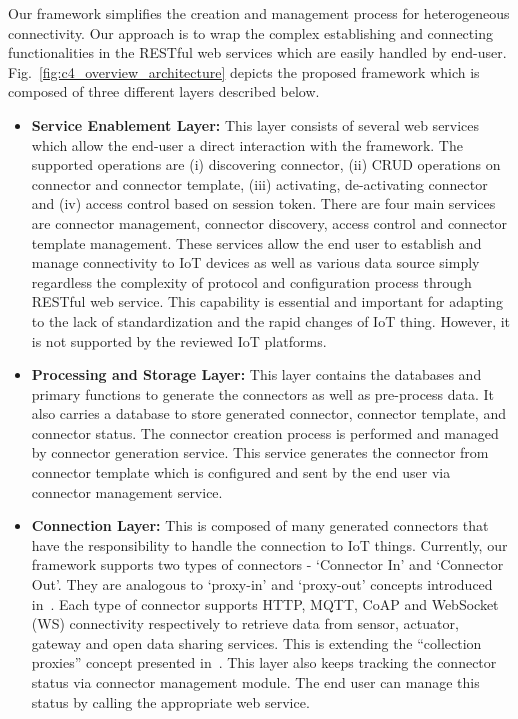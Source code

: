 Our framework simplifies the creation and management process for heterogeneous connectivity. Our approach is to wrap the complex establishing and connecting functionalities in the RESTful web services which are easily handled by end-user. Fig.~\ref{fig:c4_overview_architecture} depicts the proposed framework which is composed of three different layers described below.
\begin{itemize}
    \item \textbf{Service Enablement Layer:} This layer consists of several web services which allow the end-user a direct interaction with the framework. The supported operations are (i) discovering connector, (ii) CRUD operations on connector and connector template, (iii) activating, de-activating connector and (iv) access control based on session token. There are four main services are connector management, connector discovery, access control and connector template management. These services allow the end user to establish and manage connectivity to IoT devices as well as various data source simply regardless the complexity of protocol and configuration process through RESTful web service. This capability is essential and important for adapting to the lack of standardization and the rapid changes of IoT thing. However, it is not supported by the reviewed IoT platforms.
    \item \textbf{Processing and Storage Layer:} This layer contains the databases and primary functions to generate the connectors as well as pre-process data. It also carries a database to store generated connector, connector template, and connector status. The connector creation process is performed and managed by connector generation service. This service generates the connector from connector template which is configured and sent by the end user via connector management service.
    \item \textbf{Connection Layer: } This is composed of many generated connectors that have the responsibility to handle the connection to IoT things. Currently, our framework supports two types of connectors - ‘Connector In’ and ‘Connector Out’. They are analogous to ‘proxy-in’ and ‘proxy-out’ concepts introduced in~\cite{datta2014iot}. Each type of connector supports HTTP, MQTT, CoAP and WebSocket (WS) connectivity respectively to retrieve data from sensor, actuator, gateway and open data sharing services. This is extending the ``collection proxies'' concept presented in~\cite{datta2016easing}. This layer also keeps tracking the connector status via connector management module. The end user can manage this status by calling the appropriate web service. 
\end{itemize}
